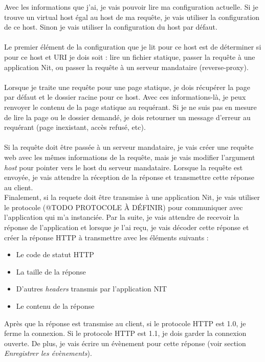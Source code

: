 \documentclass{scrreprt}
\begin{document}
Avec les informations que j'ai, je vais pouvoir lire ma configuration actuelle. Si
je trouve un virtual host égal au host de ma requête, je vais utiliser la configuration
de ce host. Sinon je vais utiliser la configuration du host par défaut. \\
\\
Le premier élément de la configuration que je lit pour ce host est de déterminer
si pour ce host et URI je dois soit : lire un fichier statique, passer la requête
à une application Nit, ou passer la requête à un serveur mandataire (reverse-proxy).\\
\\
Lorsque je traite une requête pour une page statique, je dois récupérer la page par
défaut et le dossier racine pour ce host. Avec ces informations-là, je peux renvoyer
le contenu de la page statique au requérant. Si je ne suis pas en mesure de lire
la page ou le dossier demandé, je dois retourner un message d'erreur au requérant
(page inexistant, accès refusé, etc).\\
\\
Si la requête doit être passée à un serveur mandataire, je vais créer
une requête web avec les mêmes informations de la requête, mais je vais modifier
l'argument \textit{host} pour pointer vers le host du serveur mandataire. Lorsque
la requête est envoyée, je vais attendre la réception de la réponse et transmettre
cette réponse au client.
\\
Finalement, si la requete doit être transmise à une application Nit, je vais utiliser
le protocole (@TODO PROTOCOLE À DÉFINIR) pour communiquer avec l'application
qui m'a instanciée. Par la suite, je vais attendre de recevoir la réponse de l'application
et lorsque je l'ai reçu, je vais décoder cette réponse et créer la réponse HTTP
à transmettre avec les éléments suivants :
\begin{itemize}
    \item Le code de statut HTTP
    \item La taille de la réponse
    \item D'autres \textit{headers} transmis par l'application NIT
    \item Le contenu de la réponse
\end{itemize}
Après que la réponse est transmise au client, si le protocole HTTP est 1.0, je ferme
la connexion. Si le protocole HTTP est 1.1, je dois garder la connexion
ouverte. De plus, je vais écrire un évènement pour cette réponse (voir section
\textit{Enregistrer les évènements}).
\end{document}
